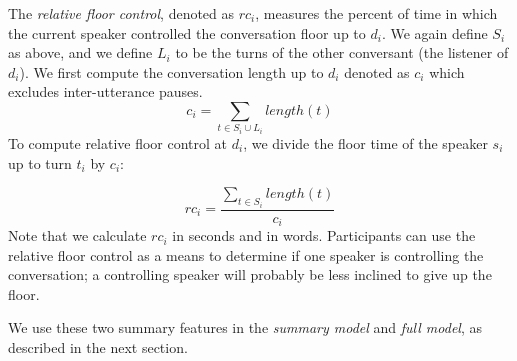      The \textit{relative floor control}, denoted as $rc_i$, measures the percent of time in which the current speaker controlled the conversation floor up to $d_i$. We again define $S_i$ as above, and we define $L_i$ to be the turns of the other conversant (the listener of $d_i$). We first compute the conversation length up to $d_i$ denoted as $c_i$ which excludes inter-utterance pauses.
     \begin{equation}
         c_i = \sum_{t \in S_i \cup L_i} length(t)
     \end{equation}
     To compute relative floor control at $d_i$, we divide the floor time of the speaker $s_i$ up to turn $t_i$ by $c_i$:

     \begin{equation}
        rc_i = \frac{\sum_{t \in S_i} length(t)} {c_i}
     \end{equation}
     Note that we calculate $rc_i$ in seconds and in words. Participants can use the relative floor control as a means to determine if one speaker is controlling the conversation; a controlling speaker will probably be less inclined to give up the floor.

     We use these two summary features in the \textit{summary model} and \textit{full model}, as described in the next section.


